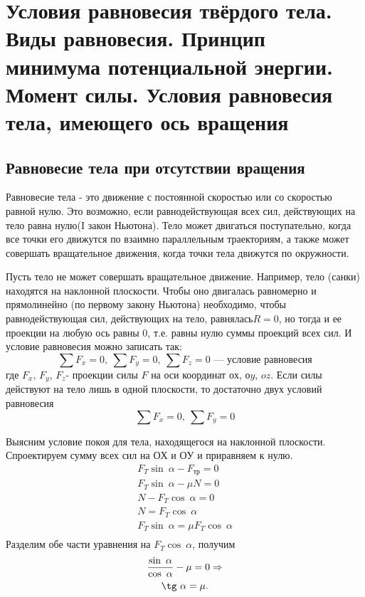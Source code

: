 \documentclass[a5paper, 10pt]{diss_4}
\renewcommand{\'}{\,'}
\begin{document}
\section{Условия равновесия твёрдого тела. Виды равновесия. Принцип минимума потенциальной энергии. Момент силы. Условия равновесия тела, имеющего ось вращения}
\subsection{Равновесие тела при отсутствии вращения}

Равновесие тела - это движение с постоянной скоростью или со скоростью  равной нулю. Это возможно, если равнодействующая всех сил, действующих на тело равна нулю(I закон Ньютона). Тело может двигаться поступательно, когда все точки его движутся по взаимно параллельным траекториям, а также может совершать вращательное движения, когда точки тела движутся по окружности.

Пусть тело не может совершать вращательное движение. Например, тело (санки) находятся на наклонной плоскости. Чтобы  оно двигалась равномерно и прямолинейно (по первому закону Ньютона) необходимо, чтобы равнодействующая сил, действующих на тело, равнялась$ R=0$, но тогда и ее проекции на любую ось равны 0, т.е. равны нулю суммы проекций всех сил. И условие равновесия можно записать так:
\[
\sum F_x=0,\ \sum F_y=0,\ \sum F_z=0\text{ --- условие равновесия}
\]
где $F_x$, $F_y$, $F_z$- проекции силы $F$ на оси координат $ох$, $оy$, $oz$. Если силы действуют на тело лишь в одной плоскости, то достаточно двух условий равновесия
\[
\sum F_x=0,\ \sum F_y=0
\]

Выясним  условие покоя для тела, находящегося на наклонной плоскости. Спроектируем сумму всех сил на $ОХ$ и $ОУ$ и приравняем к нулю.
\begin{gather*}
F_T\sin\ \alpha-F_{тр}=0\\
F_T\sin\ \alpha-\mu N=0\\
N-F_T\cos\ \alpha=0\\
N=F_T\cos\ \alpha\\
F_T\sin\ \alpha = \mu F_T\cos\ \alpha\\
\end{gather*}
Разделим обе части уравнения на $F_T\cos\ \alpha$, получим
\begin{gather*}
\frac{\sin\ \alpha}{\cos\ \alpha}-\mu=0\Rightarrow\\
\tg\ \alpha=\mu.\\
\end{gather*}
\end{document}
